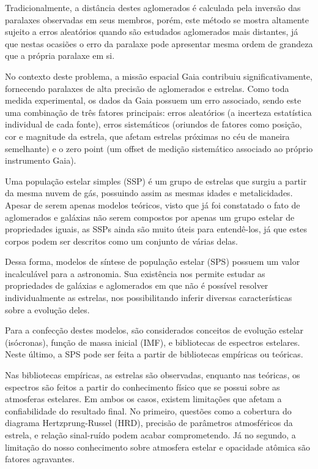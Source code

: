 \documentclass[12pt]{projeto}
\begin{document}
Tradicionalmente, a distância destes aglomerados é calculada pela inversão das paralaxes observadas em seus membros, porém, este método se mostra altamente sujeito a erros aleatórios quando são estudados aglomerados mais distantes, já que nestas ocasiões o erro da paralaxe pode apresentar mesma ordem de grandeza que a própria paralaxe em si.

No contexto deste problema, a missão espacial Gaia contribuiu significativamente, fornecendo paralaxes de alta precisão de aglomerados e estrelas. Como toda medida experimental, os dados da Gaia possuem um erro associado, sendo este uma combinação de três fatores principais: erros aleatórios (a incerteza estatística individual de cada fonte), erros sistemáticos (oriundos de fatores como posição, cor e magnitude da estrela, que afetam estrelas próximas no céu de maneira semelhante) e o zero point (um offset de medição sistemático associado ao próprio instrumento Gaia).

Uma população estelar simples (SSP) é um grupo de estrelas que surgiu a partir da mesma nuvem de gás, possuindo  assim as mesmas idades e metalicidades. Apesar de serem apenas modelos teóricos, visto que já foi constatado o fato de aglomerados e galáxias não serem compostos por apenas um grupo estelar de propriedades iguais, as SSPs ainda são muito úteis para entendê-los, já que estes corpos podem ser descritos como um conjunto de várias delas. 

Dessa forma, modelos de síntese de população estelar (SPS) possuem um valor incalculável para a astronomia. Sua existência nos permite estudar as propriedades de galáxias e aglomerados em que não é possível resolver individualmente as estrelas, nos possibilitando inferir diversas características sobre a evolução deles. \cite{BC03}

Para a confecção destes modelos, são considerados conceitos de evolução estelar (isócronas), função de massa inicial (IMF), e bibliotecas de espectros estelares. Neste último, a SPS pode ser feita a partir de bibliotecas empíricas ou teóricas. \cite{Paula2020}

Nas bibliotecas empíricas, as estrelas são observadas, enquanto nas teóricas, os espectros são feitos a partir do conhecimento físico que se possui sobre as atmosferas estelares. Em ambos os casos, existem limitações que afetam a confiabilidade do resultado final. No primeiro, questões como a cobertura do diagrama Hertzprung-Russel (HRD), precisão de parâmetros atmosféricos da estrela, e relação sinal-ruído podem acabar comprometendo. Já no segundo, a limitação do nosso conhecimento sobre atmosfera estelar e opacidade atômica são fatores agravantes.
\end{document}
